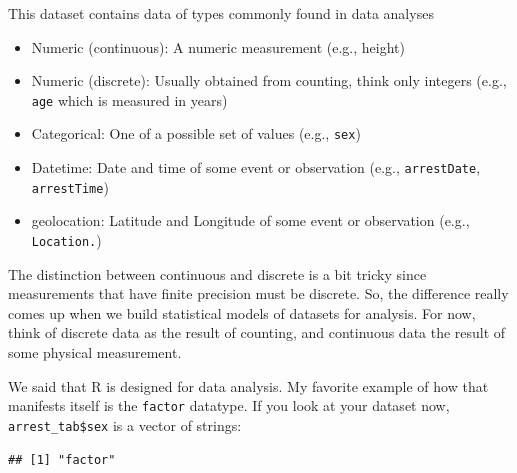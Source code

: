 \documentclass[12pt,]{book}
\newenvironment{Shaded}{\begin{snugshade}}{\end{snugshade}}
\newcommand{\KeywordTok}[1]{\textcolor[rgb]{0.13,0.29,0.53}{\textbf{#1}}}
\newcommand{\OperatorTok}[1]{\textcolor[rgb]{0.81,0.36,0.00}{\textbf{#1}}}
\newcommand{\NormalTok}[1]{#1}
\providecommand{\tightlist}{%
  \setlength{\itemsep}{0pt}\setlength{\parskip}{0pt}}
\theoremstyle{definition}
\theoremstyle{definition}
\theoremstyle{definition}
\theoremstyle{remark}
\begin{document}
This dataset contains data of types commonly found in data analyses

\begin{itemize}
\tightlist
\item
  Numeric (continuous): A numeric measurement (e.g., height)\\
\item
  Numeric (discrete): Usually obtained from counting, think only
  integers (e.g., \texttt{age} which is measured in years)\\
\item
  Categorical: One of a possible set of values (e.g., \texttt{sex})\\
\item
  Datetime: Date and time of some event or observation (e.g.,
  \texttt{arrestDate}, \texttt{arrestTime})\\
\item
  geolocation: Latitude and Longitude of some event or observation
  (e.g., \texttt{Location.})
\end{itemize}

The distinction between continuous and discrete is a bit tricky since
measurements that have finite precision must be discrete. So, the
difference really comes up when we build statistical models of datasets
for analysis. For now, think of discrete data as the result of counting,
and continuous data the result of some physical measurement.

We said that R is designed for data analysis. My favorite example of how
that manifests itself is the \texttt{factor} datatype. If you look at
your dataset now, \texttt{arrest\_tab\$sex} is a vector of strings:

\begin{Shaded}
\end{Shaded}

\begin{verbatim}
## [1] "factor"
\end{verbatim}

\begin{Shaded}
\end{Shaded}
\end{document}
